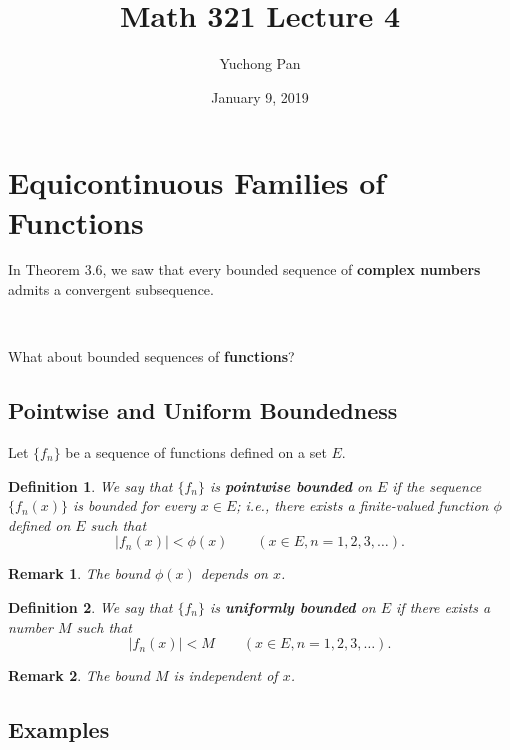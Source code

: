 \documentclass[letterpaper, reqno,11pt]{article}
\begin{document}
\title{Math 321 Lecture 4}
\author{Yuchong Pan}
\date{January 9, 2019}
\newtheorem{thm}{Theorem}
\newtheorem{defn}{Definition}
\newtheorem{exs}{Exercise}
\newtheorem{remark}{Remark}
\newtheorem{claim}{Claim}
\maketitle
%

\section{Equicontinuous Families of Functions}

In Theorem 3.6, we saw that every bounded sequence of {\bf complex numbers} admits a convergent subsequence.

~

 What about bounded sequences of {\bf functions}?

\subsection{Pointwise and Uniform Boundedness}

Let $\{ f_n \}$ be a sequence of functions defined on a set $E$.

\begin{defn}
  \normalfont We say that $\{ f_n \}$ is {\bf pointwise bounded} on $E$ if the sequence $\{ f_n(x) \}$ is bounded for every $x \in E$; i.e., there exists a finite-valued function $\phi$ defined on $E$ such that
  $$ |f_n(x)| < \phi(x) \qquad (x \in E, n = 1, 2, 3, \ldots). $$
\end{defn}

\begin{remark}
  \normalfont The bound $\phi(x)$ depends on $x$.
\end{remark}

\begin{defn}
  \normalfont We say that $\{ f_n \}$ is {\bf uniformly bounded} on $E$ if there exists a number $M$ such that
  $$ |f_n(x)| < M \qquad (x \in E, n = 1, 2, 3, \ldots). $$
\end{defn}

\begin{remark}
  \normalfont The bound $M$ is independent of $x$.
\end{remark}

\subsection{Examples}
\end{document}
